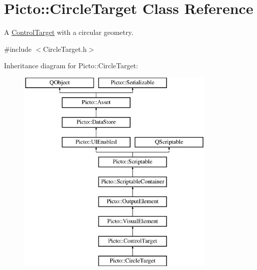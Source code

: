 \hypertarget{class_picto_1_1_circle_target}{\section{Picto\-:\-:Circle\-Target Class Reference}
\label{class_picto_1_1_circle_target}
}


A \hyperlink{class_picto_1_1_control_target}{Control\-Target} with a circular geometry.  




{\ttfamily \#include $<$Circle\-Target.\-h$>$}

Inheritance diagram for Picto\-:\-:Circle\-Target\-:\begin{figure}[H]
\begin{center}
\leavevmode
\includegraphics[height=10.000000cm]{class_picto_1_1_circle_target}
\end{center}
\end{figure}
